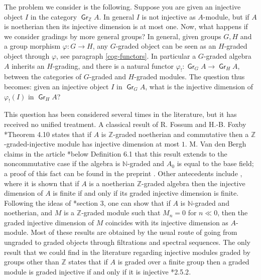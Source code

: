 \documentclass[11pt,fleqn]{article}
\newcommand\NN{\mathbb N}
\newcommand\ZZ{\mathbb Z}
\renewcommand\to{\longrightarrow}
\renewcommand\phi{\varphi}
\DeclareMathOperator\Gr{\mathsf{Gr}}
\begin{document}
The problem we consider is the following. Suppose you are given an injective 
object $I$ in the category $\Gr_\ZZ A$. In general $I$ is not 
injective as $A$-module, but if $A$ is noetherian then 
its injective dimension is at most one. Now, what happens if we consider 
gradings by more general groups? In general, given groups $G, H$ and 
a group morphism $\phi: G \to H$, any $G$-graded object can be seen as an 
$H$-graded object through $\phi$, see paragraph \ref{cog-functors}. In 
particular a $G$-graded algebra $A$ inherits an $H$-grading, and there is a 
natural functor $\phi_!: \Gr_G A \to \Gr_H A$, between the categories of 
$G$-graded and $H$-graded modules. The question thus becomes: given an 
injective object $I$ in $\Gr_G A$, what is the injective dimension of 
$\phi_!(I)$ in $\Gr_H A$?

This question has been considered several times in the literature, but it has 
received no unified treatment. A classical result of R. Fossum and H.-B. Foxby 
\cite{FF-graded}*{Theorem 4.10} states that if $A$ is $\ZZ$-graded noetherian 
and commutative then a $\ZZ$-graded-injective module has injective dimension 
at most $1$. M. Van den Bergh claims in the article 
\cite{VdB-existence-dc}*{below Definition 6.1} that this result extends to the 
noncommutative case if the algebra is $\NN$-graded and $A_0$ is equal to the 
base field; a proof of this fact can be found in the preprint \cite{Yek-note}. 
Other antecedents include \cite{Eks-auslander}, where it is shown that if $A$ 
is a noetherian $\ZZ$-graded algebra then the injective dimension of $A$ is 
finite if and only if its graded injective dimension is finite. Following the 
ideas of \cite{Lev-ncreg}*{section 3}, one can show that if $A$ is 
$\NN$-graded and noetherian, and $M$ is a $\ZZ$-graded module such that $M_n 
= 0$ for $n \ll 0$, then the graded injective dimension of $M$ coincides with 
its injective dimension as $A$-module. Most of these results are obtained by 
the usual route of going from ungraded to graded objects through filtrations 
and spectral sequences. The only result that we could find in the literature 
regarding injective modules graded by groups other than $\ZZ$ states that if 
$A$ is graded over a finite group then a graded module is graded injective if 
and only if it is injective \cite{NV-graded-book3}*{2.5.2}. 
\end{document}
